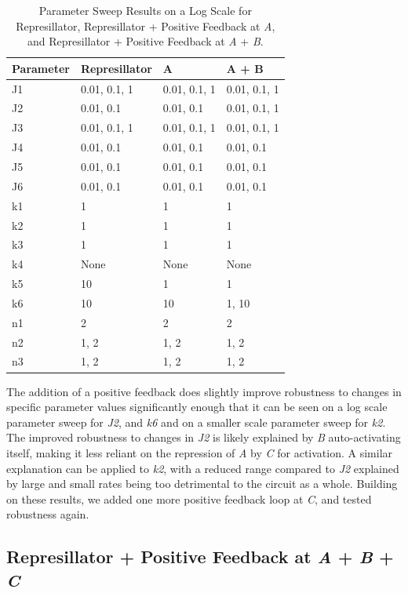 \documentclass{article}
\begin{document}
\begin{table}[H]
\centering
\begin{tabular}{|l|l|l|l|}
\hline
\textbf{Parameter} & \textbf{Represillator} & \textbf{A} & \textbf{A + B} \\
\hline
J1 & 0.01, 0.1, 1 & 0.01, 0.1, 1 & 0.01, 0.1, 1 \\
J2 & 0.01, 0.1 & 0.01, 0.1 & 0.01, 0.1, 1 \\
J3 & 0.01, 0.1, 1 & 0.01, 0.1, 1 & 0.01, 0.1, 1 \\
J4 & 0.01, 0.1 & 0.01, 0.1 & 0.01, 0.1 \\
J5 & 0.01, 0.1 & 0.01, 0.1 & 0.01, 0.1 \\
J6 & 0.01, 0.1 & 0.01, 0.1 & 0.01, 0.1 \\
k1 & 1 & 1 & 1 \\
k2 & 1 & 1 & 1 \\
k3 & 1 & 1 & 1 \\
k4 & None & None & None \\
k5 & 10 & 1 & 1 \\
k6 & 10 & 10 & 1, 10 \\
n1 & 2 & 2 & 2 \\
n2 & 1, 2 & 1, 2 & 1, 2 \\
n3 & 1, 2 & 1, 2 & 1, 2 \\
\hline
\end{tabular}
\caption{Parameter Sweep Results on a Log Scale for Represillator, Represillator + Positive Feedback at \textit{A}, and Represillator + Positive Feedback at \textit{A} + \textit{B}.}
\end{table}


The addition of a positive feedback does slightly improve robustness to changes in specific parameter values significantly enough that it can be seen on a log scale parameter sweep for \textit{J2}, and \textit{k6} and on a smaller scale parameter sweep for \textit{k2}. The improved robustness to changes in \textit{J2} is likely explained by \textit{B} auto-activating itself, making it less reliant on the repression of \textit{A} by \textit{C} for activation. A similar explanation can be applied to \textit{k2}, with a reduced range compared to \textit{J2} explained by large and small rates being too detrimental to the circuit as a whole. Building on these results, we added one more positive feedback loop at \textit{C}, and tested robustness again.  

\subsection{Represillator + Positive Feedback at \textit{A} + \textit{B} + \textit{C}}
\end{document}
